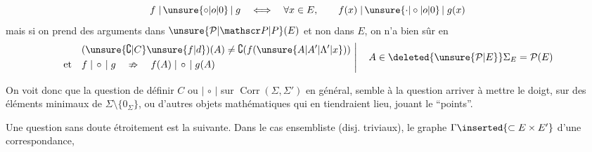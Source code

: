 \[
 f\mathrel{|\,\unsure{\circ|o|0}\,|}g\quad\Longleftrightarrow\quad
 \forall x\in E,\qquad f(x)\mathrel{|\,\unsure{\cdot|\circ|o|0}\,|}g(x)
\]
mais si on prend des arguments dans $\unsure{\mathcal P|\mathscr P|P}(E)$ et non dans $E$, on n'a bien sûr  en 
\[
 \left.\begin{aligned}
 &(\unsure{\complement|C}\unsure{f|d})(A)\ne\complement(f(\unsure{A|A'|\Lambda'|x}))\\
 \text{et}\quad &f\mathrel{|\,\circ\,|}g\quad\nRightarrow\quad f(A)\mathrel{|\,\circ\,|}g(A)
 \end{aligned}\ \right|\quad A\in\deleted{\unsure{\mathcal P|E}}\Sigma_E=\mathcal P(E)
\]

On voit donc que la question de définir $C$ ou $\mathrel{|\,\circ\,|}$ sur $\operatorname{Corr}(\Sigma,\Sigma')$ en général, semble  à la question arriver à mettre le doigt,  sur des éléments minimaux de $\Sigma\setminus\{0_{\Sigma}\}$, ou d'autres objets mathématiques qui en tiendraient lieu, jouant le   ``points''.

Une question sans doute étroitement  est la suivante. Dans le cas ensembliste (disj. triviaux),  le graphe $\Gamma\inserted{\subset E\times E'}$ d'une correspondance, 
